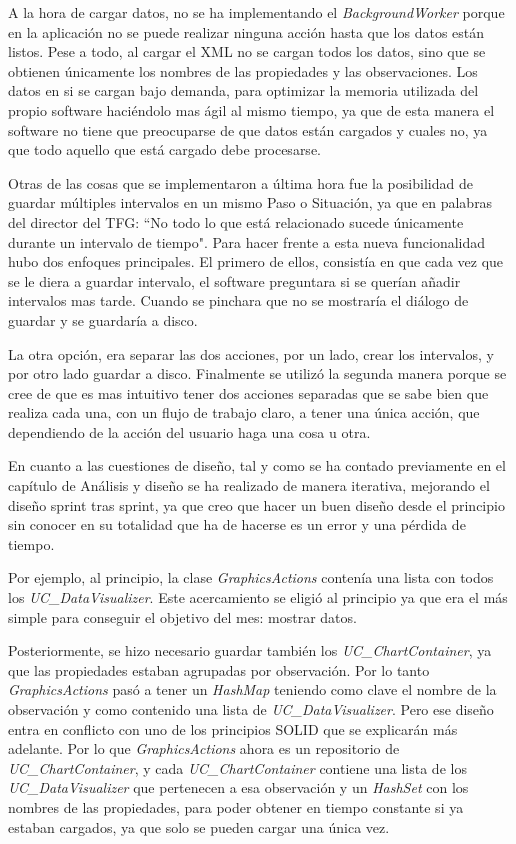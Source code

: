A la hora de cargar datos, no se ha implementando el \emph{BackgroundWorker}
porque en la aplicaci\'on no se puede realizar ninguna acci\'on hasta que los datos est\'an 
listos. Pese a todo, al cargar el XML no se cargan todos los datos, sino que se obtienen \'unicamente
los nombres de las propiedades y las observaciones. Los datos en si se cargan bajo demanda, para optimizar la memoria
utilizada del propio software haci\'endolo mas \'agil al mismo tiempo, ya que de esta manera el software no
tiene que preocuparse de que datos est\'an cargados y cuales no, ya que todo aquello que est\'a cargado debe
procesarse.

Otras de las cosas que se implementaron a \'ultima hora fue la posibilidad de guardar m\'ultiples
intervalos en un mismo Paso o Situaci\'on, ya que en palabras del director del TFG: ``No todo lo que est\'a 
relacionado sucede \'unicamente durante un intervalo de tiempo". Para hacer frente a esta nueva funcionalidad
hubo dos enfoques principales. El primero de ellos, consist\'ia en que cada vez que se le diera a guardar
intervalo, el software preguntara si se quer\'ian a\~nadir intervalos mas tarde. Cuando se pinchara que no
se mostrar\'ia el di\'alogo de guardar y se guardar\'ia a disco.

La otra opci\'on, era separar las dos acciones, por un lado, crear los intervalos, y por otro lado guardar a disco.
Finalmente se utiliz\'o la segunda manera porque se cree de que es mas intuitivo tener dos acciones separadas
que se sabe bien que realiza cada una, con un flujo de trabajo claro, a tener una \'unica acci\'on, que dependiendo
de la acci\'on del usuario haga una cosa u otra. 

En cuanto a las cuestiones de dise\~no, tal y como se ha contado previamente en el cap\'itulo
de An\'alisis y dise\~no se ha realizado de manera iterativa, mejorando el dise\~no sprint tras sprint,
ya que creo que hacer un buen dise\~no desde el principio sin conocer en su totalidad que ha de hacerse
es un error y una p\'erdida de tiempo.

Por ejemplo, al principio, la clase \emph{GraphicsActions} conten\'ia una lista con todos los 
\emph{UC\_DataVisualizer}. Este
acercamiento se eligi\'o al principio ya que era el m\'as simple para conseguir el objetivo del mes: mostrar datos.

Posteriormente, se hizo necesario guardar tambi\'en los \emph{UC\_ChartContainer}, ya que las propiedades estaban agrupadas por
observaci\'on. Por lo tanto \emph{GraphicsActions} pas\'o a tener un \emph{HashMap} teniendo como clave el nombre de la 
observaci\'on
y como contenido una lista de \emph{UC\_DataVisualizer}. Pero ese dise\~no entra en conflicto con uno de los principios
SOLID que se explicar\'an m\'as adelante. Por lo que \emph{GraphicsActions} ahora es un repositorio de 
\emph{UC\_ChartContainer},
y cada \emph{UC\_ChartContainer} contiene una lista de los\emph{ UC\_DataVisualizer} que 
pertenecen a esa observaci\'on y un \emph{HashSet}
con los nombres de las propiedades, para poder obtener en tiempo constante si ya estaban cargados, ya que solo se pueden cargar
una \'unica vez.

